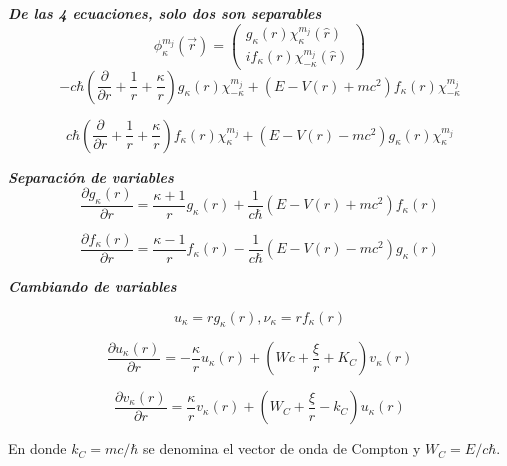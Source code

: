 \documentclass{beamer}
\begin{document}
\begin{frame}{\textit{\textbf{De las 4 ecuaciones, solo dos son separables}}}
\begin{equation}\label{eq:funciondeonda}
\phi^{m_j}_{\kappa} (\vec{r} ) = \left( \substack{g_{\kappa}(r)\chi^{m_j}_\kappa (\hat{r}) \\ if_\kappa(r)\chi^{m_j}_{-\kappa} (\hat{r}) } \right) 
\end{equation}
\begin{equation}
-c \hbar  \left( \frac{\partial}{\partial r}+\frac{1}{r}+\frac{\kappa}{r} \right) g_{\kappa}(r)\chi^{m_j}_{-\kappa} +(E-V(r)+mc^2)f_{\kappa}(r)\chi^{m_j}_{-\kappa}
\end{equation}


\begin{equation}
c \hbar  \left( \frac{\partial}{\partial r}+\frac{1}{r}+\frac{\kappa}{r} \right) f_{\kappa}(r)\chi^{m_j}_{\kappa} +(E-V(r)-mc^2)g_{\kappa}(r)\chi^{m_j}_{\kappa}
\end{equation}

\end{frame}

\begin{frame}{\textit{\textbf{Separaci\'on de variables}}}
\begin{equation}
\frac{\partial g_{\kappa}(r)}{\partial r} =\frac{\kappa+1}{r}g_{\kappa}(r)+\frac{1}{c\hbar}(E-V(r)+mc^2)f_{\kappa}(r)
\end{equation}

\begin{equation}
\frac{\partial f_{\kappa}(r)}{\partial r} =\frac{\kappa-1}{r}f_{\kappa}(r)-\frac{1}{c\hbar}(E-V(r)-mc^2)g_{\kappa}(r)
\end{equation}
\end{frame}

\begin{frame}{\textit{\textbf{Cambiando de variables}}}

\[
u_{\kappa} = r g_{\kappa}(r), \nu_{\kappa} = r f_{\kappa}(r)
\]

\begin{equation}\label{eq:Hrad1}
\dfrac{\partial u_{\kappa}(r)}{\partial r} =-\dfrac{\kappa}{r}u_{\kappa}(r)+\left ( Wc+\dfrac{\xi}{r}+K_C \right ) v_{\kappa}(r)
\end{equation}

\begin{equation}\label{eq:Hrad2}
\dfrac{\partial v_{\kappa}(r)}{\partial r} =\dfrac{\kappa}{r}v_{\kappa}(r)+
\left ( W_C + \dfrac{\xi}{r} - k_C \right )u_{\kappa}(r)
\end{equation}

En donde $k_C = mc/\hbar$ se denomina el vector de onda de Compton y 
$W_C = E / c\hbar$.
\end{frame}
\end{document}
